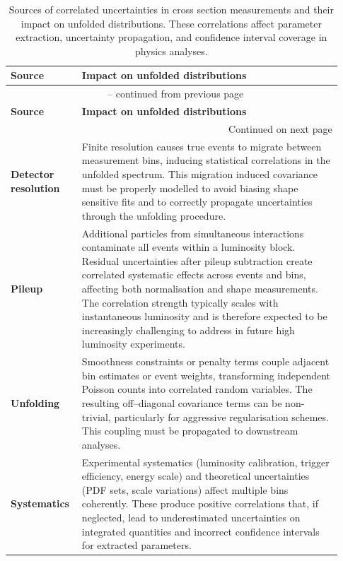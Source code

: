 \begin{longtable}{p{0.18\linewidth} p{0.75\linewidth}}
    \caption[Sources of correlated uncertainties in cross section measurements.]{Sources of correlated uncertainties in cross section measurements and their impact on unfolded distributions. 
    These correlations affect parameter extraction, uncertainty propagation, and confidence interval coverage in physics analyses.}
    \label{tab:correlations} \\
    \toprule
    \textbf{Source} & \textbf{Impact on unfolded distributions} \\
    \midrule
    \endfirsthead
    
    \multicolumn{2}{c}{\tablename\ \thetable{} -- continued from previous page} \\
    \toprule
    \textbf{Source} & \textbf{Impact on unfolded distributions} \\
    \midrule
    \endhead
    
    \midrule
    \multicolumn{2}{r}{Continued on next page} \\
    \endfoot
    
    \bottomrule
    \endlastfoot
    
    \textbf{Detector \mbox{resolution}} & 
    Finite resolution causes true events to migrate between measurement bins, inducing statistical correlations in the unfolded spectrum. 
    This migration induced covariance must be properly modelled to avoid biasing shape sensitive fits and to correctly propagate uncertainties through the unfolding procedure. \\
    
    \textbf{Pileup} & 
    Additional particles from simultaneous interactions contaminate all events within a luminosity block. 
    Residual uncertainties after pileup subtraction create correlated systematic effects across events and bins, affecting both normalisation and shape measurements. 
    The correlation strength typically scales with instantaneous luminosity and is therefore expected to be increasingly challenging to address in future high luminosity experiments. \\
    
    \textbf{Unfolding} & 
    Smoothness constraints or penalty terms couple adjacent bin estimates or event weights, transforming independent Poisson counts into correlated random variables. 
    The resulting off--diagonal covariance terms can be non-trivial, particularly for aggressive regularisation schemes. 
    This coupling must be propagated to downstream analyses. \\
    
    \textbf{Systematics} & 
    Experimental systematics (luminosity calibration, trigger efficiency, energy scale) and theoretical uncertainties (PDF sets, scale variations) affect multiple bins coherently. 
    These produce positive correlations that, if neglected, lead to underestimated uncertainties on integrated quantities and incorrect confidence intervals for extracted parameters. \\
\end{longtable}
